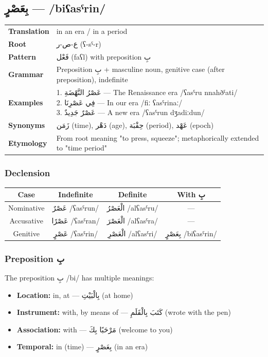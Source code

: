 \documentclass[letterpaper,12pt]{article}
\begin{document}
\subsection{\textarabic{بِعَصْرٍ} — /biʕasˤrin/}
\begin{tabular}{p{3cm}p{10cm}}
\toprule
\textbf{Translation} & in an era / in a period \\
\textbf{Root} & \textarabic{ع-ص-ر} (ʕ-sˤ-r) \\
\textbf{Pattern} & \textarabic{فَعْل} (faʕl) with preposition \textarabic{بِ} \\
\textbf{Grammar} & Preposition \textarabic{بِ} + masculine noun, genitive case (after preposition), indefinite \\
\midrule
\textbf{Examples} & \makecell[l]{\parbox{9.5cm}{
1. \textarabic{عَصْرُ النَّهْضَةِ} — The Renaissance era /ʕasˤru nnahðˤati/\\
2. \textarabic{فِي عَصْرِنَا} — In our era /fiː ʕasˤrinaː/\\
3. \textarabic{عَصْرٌ جَدِيدٌ} — A new era /ʕasˤrun dʒadiːdun/
}} \\
\midrule
\textbf{Synonyms} & \textarabic{زَمَن} (time), \textarabic{دَهْر} (age), \textarabic{حِقْبَة} (period), \textarabic{عَهْد} (epoch) \\
\textbf{Etymology} & From root meaning "to press, squeeze"; metaphorically extended to "time period" \\
\bottomrule
\end{tabular}

\subsubsection*{Declension}
\begin{tabular}{|c|c|c|c|}
\hline
\textbf{Case} & \textbf{Indefinite} & \textbf{Definite} & \textbf{With \textarabic{بِ}} \\
\hline
Nominative & \textarabic{عَصْرٌ} /ʕasˤrun/ & \textarabic{الْعَصْرُ} /alʕasˤru/ & — \\
\hline
Accusative & \textarabic{عَصْرًا} /ʕasˤran/ & \textarabic{الْعَصْرَ} /alʕasˤra/ & — \\
\hline
Genitive & \textarabic{عَصْرٍ} /ʕasˤrin/ & \textarabic{الْعَصْرِ} /alʕasˤri/ & \textarabic{بِعَصْرٍ} /biʕasˤrin/ \\
\hline
\end{tabular}

\subsubsection*{Preposition \textarabic{بِ}}
The preposition \textarabic{بِ} /bi/ has multiple meanings:
\begin{itemize}
\item \textbf{Location:} in, at — \textarabic{بِالْبَيْتِ} (at home)
\item \textbf{Instrument:} with, by means of — \textarabic{كَتَبَ بِالْقَلَمِ} (wrote with the pen)
\item \textbf{Association:} with — \textarabic{مَرْحَبًا بِكَ} (welcome to you)
\item \textbf{Temporal:} in (time) — \textarabic{بِعَصْرٍ} (in an era)
\end{itemize}
\end{document}
